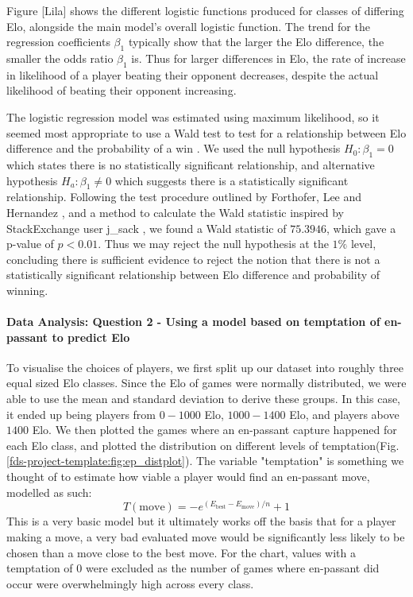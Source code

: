 \documentclass[10pt,a4paper]{article}
\begin{document}
\begin{multicols}{2}
Figure [Lila] shows the different logistic functions produced for classes of differing Elo, alongside the main model's overall logistic function. The trend for the regression coefficients $\beta_{1}$ typically show that the larger the Elo difference, the smaller the odds ratio $\beta_{1}$ is. Thus for larger differences in Elo, the rate of increase in likelihood of a player beating their opponent decreases, despite the actual likelihood of beating their opponent increasing. \newline

The logistic regression model was estimated using maximum likelihood, so it seemed most appropriate to use a Wald test to test for a relationship between Elo difference and the probability of a win \cite{WaldTest}. We used the null hypothesis $H_{0}: \beta_{1} = 0$ which states there is no statistically significant relationship, and alternative hypothesis $H_{a}: \beta_{1} \neq 0$ which suggests there is a statistically significant relationship. Following the test procedure outlined by Forthofer, Lee and Hernandez \cite{WaldTest}, and a method to calculate the Wald statistic inspired by StackExchange user j\_sack \cite{StackExchangeWaldTest}, we found a Wald statistic of $75.3946$, which gave a p-value of $p<0.01$. Thus we may reject the null hypothesis at the $1\%$ level, concluding there is sufficient evidence to reject the notion that there is not a statistically significant relationship between Elo difference and probability of winning. \newline

\paragraph{Data Analysis: Question 2 - Using a model based on temptation of en-passant to predict Elo}
To visualise the choices of players, we first split up our dataset into roughly three equal sized Elo classes. Since the Elo of games were normally distributed, we were able to use the mean and standard deviation to derive these groups. In this case, it ended up being players from $0 - 1000$ Elo, $1000 - 1400$ Elo, and players above $1400$ Elo. We then plotted the games where an en-passant capture happened for each Elo class, and plotted the distribution on different levels of temptation(Fig. \ref{fds-project-template:fig:ep_distplot}). The variable "temptation" is something we thought of to estimate how viable a player would find an en-passant move, modelled as such:
$$T(\text{move})= -e^{(E_{\text{best}} - E_{\text{move}})/{n}} + 1$$
This is a very basic model but it ultimately works off the basis that for a player making a move, a very bad evaluated move would be significantly less likely to be chosen than a move close to the best move. For the chart, values with a temptation of $0$ were excluded as the number of games where en-passant did occur were overwhelmingly high across every class.\newline


\end{multicols}
\end{document}

